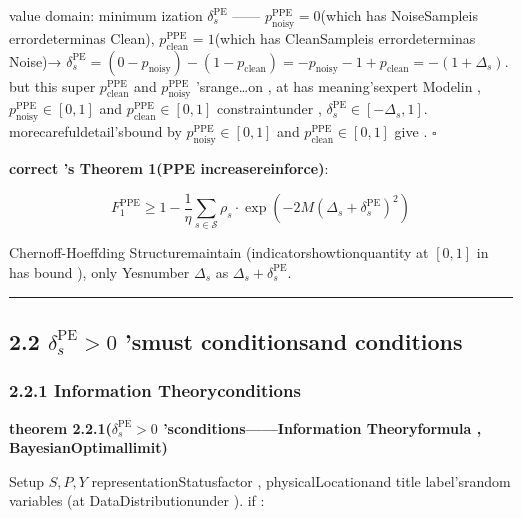 \documentclass[
  12pt,
]{article}
\begin{document}
value domain: minimum ization  \(\delta_s^{\text{PE}}\) ------
\(p_{\text{noisy}}^{\text{PPE}} = 0\)(which has NoiseSampleis errordeterminas Clean), \(p_{\text{clean}}^{\text{PPE}} = 1\)(which has CleanSampleis errordeterminas Noise)→
\(\delta_s^{\text{PE}} = (0 - p_{\text{noisy}}) - (1 - p_{\text{clean}}) = -p_{\text{noisy}} - 1 + p_{\text{clean}} = -(1 + \Delta_s)\). but this super
\(p_{\text{clean}}^{\text{PPE}}\) and  \(p_{\text{noisy}}^{\text{PPE}}\)
'srange\ldots on , at has meaning'sexpert Modelin , \(p_{\text{noisy}}^{\text{PPE}} \in [0, 1]\)
and  \(p_{\text{clean}}^{\text{PPE}} \in [0, 1]\)
constraintunder , \(\delta_s^{\text{PE}} \in [-\Delta_s, 1]\). morecarefuldetail'sbound by 
\(p_{\text{noisy}}^{\text{PPE}} \in [0,1]\) and 
\(p_{\text{clean}}^{\text{PPE}} \in [0,1]\) give . \(\square\)

\textbf{correct 's Theorem 1(PPE increasereinforce)}: 

\[\boxed{F_1^{\text{PPE}} \geq 1 - \frac{1}{\eta} \sum_{s \in \mathcal{S}} \rho_s \cdot \exp\left(-2M (\Delta_s + \delta_s^{\text{PE}})^2\right)}\]

Chernoff-Hoeffding Structuremaintain (indicatorshowtionquantity at  \([0,1]\) in has bound ), only Yesnumber 
\(\Delta_s\) as  \(\Delta_s + \delta_s^{\text{PE}}\). 

\begin{center}\rule{0.5\linewidth}{0.5pt}\end{center}

\subsection{\texorpdfstring{2.2 \(\delta_s^{\text{PE}} > 0\)
'smust conditionsand conditions}{2.2 \textbackslash delta\_s\^{}\{\textbackslash text\{PE\}\} \textgreater{} 0 'smust conditionsand conditions}}\label{delta_stextpe-0-ux7684ux5fc5ux8981ux6761ux4ef6ux548cux5145ux5206ux6761ux4ef6}

\subsubsection{2.2.1 Information Theoryconditions}\label{ux4fe1ux606fux8bbaux6761ux4ef6}

\textbf{theorem  2.2.1(\(\delta_s^{\text{PE}} > 0\)
'sconditions------Information Theoryformula , BayesianOptimallimit)}

Setup \(S, P, Y\)
representationStatusfactor , physicalLocationand title label'srandom variables (at DataDistributionunder ). if : 
\end{document}
